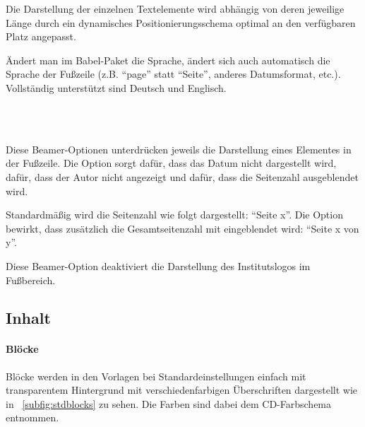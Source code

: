Die Darstellung der einzelnen Textelemente wird abhängig von deren
jeweilige Länge durch ein dynamisches Positionierungsschema optimal
an den verfügbaren Platz angepasst.

Ändert man im Babel-Paket die Sprache, ändert sich auch automatisch
die Sprache der Fußzeile (z.B. "`page"' statt "`Seite"', anderes Datumsformat, etc.).
Vollständig unterstützt sind Deutsch und Englisch.

\begin{Declaration}
  \\
  \\
\end{Declaration}

Diese Beamer-Optionen unterdrücken jeweils die Darstellung eines Elementes in der Fußzeile.
Die Option  sorgt dafür, dass das Datum nicht dargestellt wird,
 dafür, dass der Autor nicht angezeigt und
 dafür, dass die Seitenzahl ausgeblendet wird.

\begin{Declaration}
\end{Declaration}

Standardmäßig wird die Seitenzahl wie folgt dargestellt: "`Seite x"'.
Die Option  bewirkt, dass zusätzlich die Gesamtseitenzahl
mit eingeblendet wird: "`Seite x von y"'.

\begin{Declaration}
\end{Declaration}

Diese Beamer-Option deaktiviert die Darstellung des Institutslogos im Fußbereich.

\subsection{Inhalt}

\paragraph{Blöcke}

Blöcke werden in den Vorlagen bei Standardeinstellungen einfach
mit transparentem Hintergrund mit verschiedenfarbigen Überschriften dargestellt
wie in \figurename~\ref{subfig:stdblocks} zu sehen.
Die Farben sind dabei dem CD-Farbschema entnommen.

